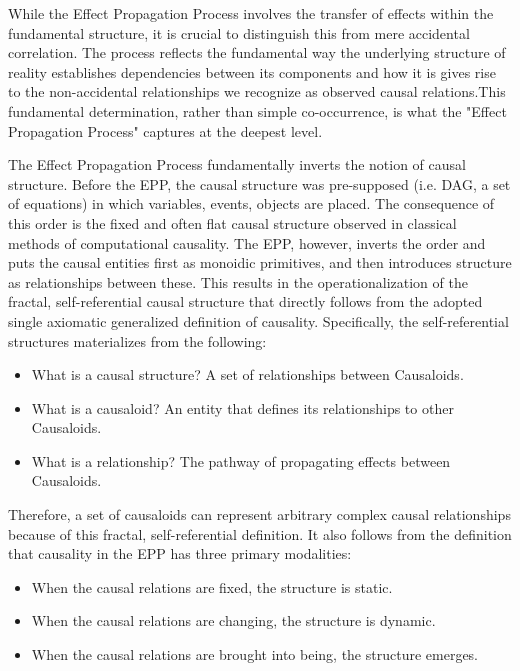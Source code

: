 While the Effect Propagation Process involves the transfer of effects within the fundamental structure, it is crucial to distinguish this from mere accidental correlation. The process reflects the fundamental way the underlying structure of reality establishes dependencies between its components and how it is gives rise to the non-accidental relationships we recognize as observed causal relations.This fundamental determination, rather than simple co-occurrence, is what the "Effect Propagation Process" captures at the deepest level.

 The Effect Propagation Process fundamentally inverts the notion of causal structure. Before the EPP, the causal structure was pre-supposed (i.e. DAG, a set of equations) in which variables, events, objects are placed. The consequence of this order is the fixed and often flat causal structure observed in classical methods of computational causality. The EPP, however, inverts the order and puts the causal entities first as monoidic primitives, and then introduces structure as relationships between these. This results in the operationalization of the fractal, self-referential causal structure that directly follows from the adopted single axiomatic generalized definition of causality. Specifically, the self-referential structures materializes from the following:

\begin{itemize}
	\item What is a causal structure? A set of relationships between Causaloids.
 	\item What is a causaloid? An entity that defines its relationships to other Causaloids. 
	\item What is a relationship? The pathway of propagating effects between Causaloids.
\end{itemize}

Therefore, a set of causaloids can represent arbitrary complex causal relationships because of this fractal, self-referential definition. It also follows from the definition that causality in the EPP has three primary modalities:
\begin{itemize}
	\item When the causal relations are fixed, the structure is static.
 	\item When the causal relations are changing, the structure is dynamic. 
 	\item When the causal relations are brought into being, the structure emerges. 
\end{itemize}

